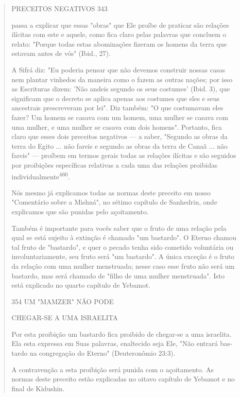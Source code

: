 \begin{quote}
PRECEITOS NEGATIVOS 343

passa a explicar que essas "obras" que Ele proíbe de praticar são
relações ilíci­tas com este e aquele, como fica claro pelas palavras que
concluem o relato: "Porque todas estas abominações fizeram os homens da
terra que estavam an­tes de vós" (Ibid., 27).

A Sifrá diz: "Eu poderia pensar que não devemos construir nossas casas
nem plantar vinhedos da maneira como o fazem as outras nações; por isso
as Escrituras dizem: 'Não andeis segundo os seus costumes' (Ibid. 3),
que significam que o decreto se aplica apenas aos costumes que eles e
seus ances­trais prescreveram por lei". Diz também: "O que costumavam
eles fazer? Um homem se casava com um homem, uma mulher se casava com
uma mulher, e uma mulher se casava com dois homens". Portanto, fica
claro que esses dois preceitos negativos --- a saber, "Segundo as obras
da terra do Egito ... não fa­reis e segundo as obras da terra de Canaã
... não fareis" --- proíbem em termos gerais todas as relações ilícitas
e são seguidos por proibições específicas relati­vas a cada uma das
relações proibidas individualmente\textsuperscript{460}.

Nós mesmo já explicamos todas as normas deste preceito em nosso
"Comentário sobre a Mishná", no sétimo capítulo de Sanhedrin, onde
explica­mos que são punidas pelo açoitamento.

Também é importante para vocês saber que o fruto de uma relação pela
qual se está sujeito à extinção é chamado "um bastardo". O Eterno
cha­mou tal fruto de "bastardo", e quer o pecado tenha sido cometido
voluntária ou involuntariamente, seu fruto será "um bastardo". A única
exceção é o fruto da relação com uma mulher menstruada; nesse caso esse
fruto não será um bas­tardo, mas será chamado de "filho de uma mulher
menstruada". Isto está ex­plicado no quarto capítulo de Yebamot.

354 UM "MAMZER" NÃO PODE

CHEGAR-SE A UMA ISRAELITA

Por esta proibição um bastardo fica proibido de chegar-se a uma
is­raelita. Ela esta expressa em Suas palavras, enaltecido seja Ele,
"Não entrará bas­tardo na congregação do Eterno" (Deuteronômio 23:3).

A contravenção a esta proibição será punida com o açoitamento. As normas
deste preceito estão explicadas no oitavo capítulo de Ye­bamot e no
final de Kidushin.


\end{quote}
